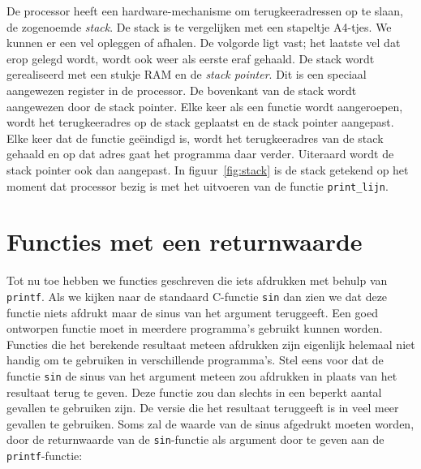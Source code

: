 \begin{infobox}
De processor heeft een hardware-mechanisme om terugkeeradressen op te slaan, de zogenoemde \textsl{stack}. De stack is te vergelijken met een stapeltje A4-tjes. We kunnen er een vel opleggen of afhalen. De volgorde ligt vast; het laatste vel dat erop gelegd wordt, wordt ook weer als eerste eraf gehaald. De stack wordt gerealiseerd met een stukje RAM en de \textsl{stack pointer}. Dit is een speciaal aangewezen register in de processor. De bovenkant van de stack wordt aangewezen door de stack pointer. Elke keer als een functie wordt aangeroepen, wordt het terugkeeradres op de stack geplaatst en de stack pointer aangepast. Elke keer dat de functie geëindigd is, wordt het terugkeeradres van de stack gehaald en op dat adres gaat het programma daar verder. Uiteraard wordt de stack pointer ook dan aangepast.
In figuur~\ref{fig:stack} is de stack getekend op het moment dat processor bezig is met het uitvoeren van de functie \texttt{print\_lijn}.

\centering%
\label{fig:stack}
\end{infobox}


\section{Functies met een returnwaarde}
Tot nu toe hebben we functies geschreven die iets afdrukken met behulp van \texttt{printf}.
Als we kijken naar de standaard C-functie \texttt{sin} dan zien we dat deze functie niets afdrukt maar de sinus van het argument teruggeeft.
Een goed ontworpen functie moet in meerdere programma’s gebruikt kunnen worden.
Functies die het berekende resultaat meteen afdrukken zijn eigenlijk helemaal niet handig om te gebruiken in verschillende programma’s.
Stel eens voor dat de functie \texttt{sin} de sinus van het argument meteen zou afdrukken in plaats van het resultaat terug te geven.
Deze functie zou dan slechts in een beperkt aantal gevallen te gebruiken zijn.
De versie die het resultaat teruggeeft is in veel meer gevallen te gebruiken. 
Soms zal de waarde van de sinus afgedrukt moeten worden, door de returnwaarde van de
\texttt{sin}-functie als argument door te geven aan de \texttt{printf}-functie:

